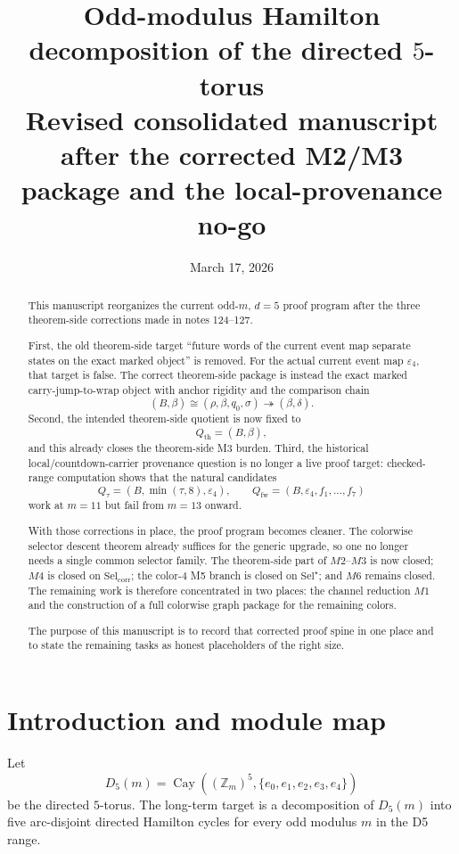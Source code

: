 \documentclass[11pt]{article}
\title{Odd-modulus Hamilton decomposition of the directed $5$-torus\\
Revised consolidated manuscript after the corrected M2/M3 package and the local-provenance no-go}
\author{}
\date{March 17, 2026}
\newcommand{\Z}{\mathbb Z}
\newcommand{\SelCorr}{\mathrm{Sel}_{\mathrm{corr}}}
\newcommand{\SelStar}{\mathrm{Sel}^{\star}}
\newcommand{\eps}{\varepsilon}
\begin{document}
\maketitle

\begin{abstract}
This manuscript reorganizes the current odd-$m$, $d=5$ proof program after the
three theorem-side corrections made in notes 124--127.

First, the old theorem-side target ``future words of the current event map
separate states on the exact marked object'' is removed. For the actual current
event map $\eps_4$, that target is false. The correct theorem-side package is
instead the exact marked carry-jump-to-wrap object with anchor rigidity and the
comparison chain
\[
(B,\beta) \cong (\rho,\beta,q_0,\sigma) \twoheadrightarrow (\beta,\delta).
\]
Second, the intended theorem-side quotient is now fixed to
\[
Q_{\mathrm{th}}=(B,\beta),
\]
and this already closes the theorem-side M3 burden. Third, the historical
local/countdown-carrier provenance question is no longer a live proof target:
checked-range computation shows that the natural candidates
\[
Q_{\tau}=(B,\min(\tau,8),\eps_4),
\qquad
Q_{\mathrm{fw}}=(B,\eps_4,f_1,\dots,f_7)
\]
work at $m=11$ but fail from $m=13$ onward.

With those corrections in place, the proof program becomes cleaner. The
colorwise selector descent theorem already suffices for the generic upgrade, so
one no longer needs a single common selector family. The theorem-side part of
$M2$--$M3$ is now closed; $M4$ is closed on $\SelCorr$; the color-$4$ M5
branch is closed on $\SelStar$; and $M6$ remains closed. The remaining work is
therefore concentrated in two places: the channel reduction $M1$ and the
construction of a full colorwise graph package for the remaining colors.

The purpose of this manuscript is to record that corrected proof spine in one
place and to state the remaining tasks as honest placeholders of the right
size.
\end{abstract}

\tableofcontents

\section{Introduction and module map}

Let
\[
D_5(m)=\operatorname{Cay}((\Z_m)^5,\{e_0,e_1,e_2,e_3,e_4\})
\]
be the directed $5$-torus. The long-term target is a decomposition of
$D_5(m)$ into five arc-disjoint directed Hamilton cycles for every odd modulus
$m$ in the D5 range.
\end{document}
